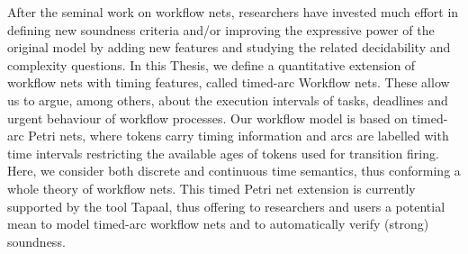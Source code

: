 After the seminal work on workflow nets, researchers have 
invested much effort in defining new soundness criteria and/or 
improving the expressive power of the original model by adding new features 
and studying the related decidability and 
complexity questions.
In this Thesis, we define a quantitative extension of workflow 
nets with timing features, called timed-arc Workflow nets. These allow us to argue, among others, 
about the execution intervals of tasks, deadlines and urgent behaviour of workflow processes. Our workflow
model is based on timed-arc Petri nets,
where tokens carry timing information
and arcs are labelled with time intervals restricting the available
ages of tokens used for transition firing. Here, we consider both discrete and continuous time
semantics, thus conforming a whole theory of workflow nets. This timed Petri net extension 
is currently supported by the tool Tapaal, thus offering to researchers and users a potential mean to model 
timed-arc workflow nets and to automatically verify (strong) soundness.

